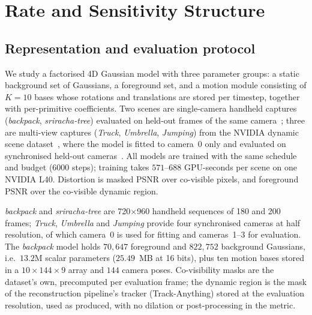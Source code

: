 \documentclass[lettersize,journal]{IEEEtran}
\begin{document}
\section{Rate and Sensitivity Structure}
\label{sec:structure}

\subsection{Representation and evaluation protocol}
\label{sec:repr}
We study a factorised 4D Gaussian model with three parameter groups: a static
background set of Gaussians, a foreground set, and a motion module consisting of
$K{=}10$ bases whose rotations and translations are stored per timestep, together
with per-primitive coefficients. Two scenes are single-camera handheld captures
(\emph{backpack}, \emph{sriracha-tree}) evaluated on held-out frames of the same
camera~\cite{gao2022_dycheck}; three are multi-view
captures (\emph{Truck}, \emph{Umbrella}, \emph{Jumping}) from the NVIDIA dynamic
scene dataset~\cite{yoon2020_nvidia}, where the model is fitted to camera~0 only
and evaluated on synchronised held-out cameras~\cite{park2021_hypernerf}. All models
are trained with the same schedule and budget (6000 steps); training takes
$571$--$688$ GPU-seconds per scene on one NVIDIA L40. Distortion is masked PSNR
over co-visible pixels, and foreground PSNR over the co-visible dynamic region.

\emph{backpack} and \emph{sriracha-tree} are 720$\times$960 handheld sequences
of 180 and 200 frames; \emph{Truck}, \emph{Umbrella} and \emph{Jumping} provide four
synchronised cameras at half resolution, of which camera~0 is used for fitting
and cameras~1--3 for evaluation. The \emph{backpack} model holds $70{,}647$ foreground and $822{,}752$ background
Gaussians, i.e.\ $13.2$M scalar parameters ($25.49$~MB at 16 bits), plus ten motion
bases stored in a $10\times144\times9$ array and $144$ camera poses. Co-visibility
masks are the dataset's own, precomputed per evaluation frame; the dynamic region
is the mask of the reconstruction pipeline's tracker (Track-Anything) stored at
the evaluation resolution, used as produced, with no dilation or post-processing
in the metric.
\end{document}
